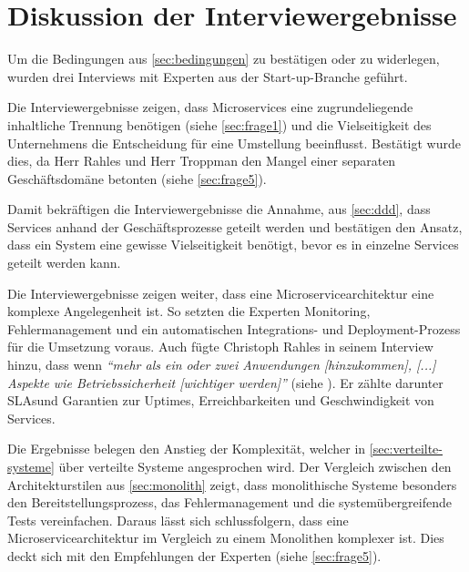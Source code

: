 \section{Diskussion der Interviewergebnisse}
\label{sec:auswertung}

Um die Bedingungen aus \cref{sec:bedingungen} zu bestätigen oder zu widerlegen, wurden drei Interviews mit Experten aus der Start-up-Branche geführt.

Die Interviewergebnisse zeigen, dass Microservices eine zugrundeliegende inhaltliche Trennung benötigen (siehe \cref{sec:frage1}) und die Vielseitigkeit des Unternehmens die Entscheidung für eine Umstellung beeinflusst. Bestätigt wurde dies, da Herr Rahles und Herr Troppman den Mangel einer separaten Geschäftsdomäne betonten (siehe \cref{sec:frage5}).

\label{sec:vielseitigkeit}
Damit bekräftigen die Interviewergebnisse die Annahme, aus \cref{sec:ddd}, dass Services anhand der Geschäftsprozesse geteilt werden und bestätigen den Ansatz, dass ein System eine gewisse Vielseitigkeit benötigt, bevor es in einzelne Services geteilt werden kann.

Die Interviewergebnisse zeigen weiter, dass eine Microservicearchitektur eine komplexe Angelegenheit ist. So setzten die Experten Monitoring, Fehlermanagement und ein automatischen Integrations- und Deployment-Prozess 
 für die Umsetzung voraus. Auch fügte Christoph Rahles in seinem Interview hinzu, dass wenn \textit{\enquote{mehr als ein oder zwei Anwendungen [hinzukommen], [...] Aspekte wie Betriebssicherheit [wichtiger werden]}} (siehe ). Er zählte darunter SLAs\footnotemark und Garantien zur Uptimes, Erreichbarkeiten und Geschwindigkeit von Services.

Die Ergebnisse belegen den Anstieg der Komplexität, welcher in \cref{sec:verteilte-systeme} über verteilte Systeme angesprochen wird. Der Vergleich zwischen den Architekturstilen aus \cref{sec:monolith} zeigt, dass monolithische Systeme besonders den Bereitstellungsprozess, das Fehlermanagement und die systemübergreifende Tests vereinfachen. Daraus lässt sich schlussfolgern, dass eine Microservicearchitektur im Vergleich zu einem Monolithen komplexer ist. Dies deckt sich mit den Empfehlungen der Experten (siehe \cref{sec:frage5}).

